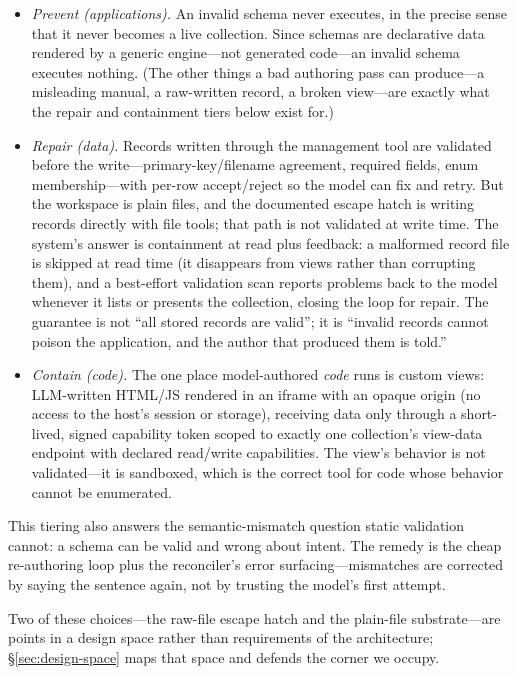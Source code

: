 \documentclass[11pt]{article}
\begin{document}
\begin{itemize}
  \item \emph{Prevent (applications).} An invalid schema never executes, in the
  precise sense that it never becomes a live collection. Since schemas are
  declarative data rendered by a generic engine---not generated code---an invalid
  schema executes nothing. (The other things a bad authoring pass can produce---a
  misleading manual, a raw-written record, a broken view---are exactly what the
  repair and containment tiers below exist for.)
  \item \emph{Repair (data).} Records written through the management tool are
  validated before the write---primary-key/filename agreement, required fields,
  enum membership---with per-row accept/reject so the model can fix and retry.
  But the workspace is plain files, and the documented escape hatch is writing
  records directly with file tools; that path is not validated at write time. The
  system's answer is containment at read plus feedback: a malformed record file
  is skipped at read time (it disappears from views rather than corrupting them),
  and a best-effort validation scan reports problems back to the model whenever
  it lists or presents the collection, closing the loop for repair. The guarantee
  is not ``all stored records are valid''; it is ``invalid records cannot poison
  the application, and the author that produced them is told.''
  \item \emph{Contain (code).} The one place model-authored \emph{code} runs is
  custom views: LLM-written HTML/JS rendered in an iframe with an opaque origin
  (no access to the host's session or storage), receiving data only through a
  short-lived, signed capability token scoped to exactly one collection's
  view-data endpoint with declared read/write capabilities. The view's behavior
  is not validated---it is sandboxed, which is the correct tool for code whose
  behavior cannot be enumerated.
\end{itemize}

This tiering also answers the semantic-mismatch question static validation
cannot: a schema can be valid and wrong about intent. The remedy is the cheap
re-authoring loop plus the reconciler's error surfacing---mismatches are
corrected by saying the sentence again, not by trusting the model's first
attempt.

Two of these choices---the raw-file escape hatch and the plain-file
substrate---are points in a design space rather than requirements of the
architecture; \S\ref{sec:design-space} maps that space and defends the corner we
occupy.
\end{document}
